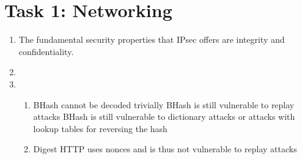 \section*{Task 1: Networking}
\begin{enumerate}
\item %
  The fundamental security properties that IPsec offers are integrity and confidentiality.

  \item \highergradesonly
  \item %
    \begin{enumerate}
    \item
      BHash cannot be decoded trivially
      BHash is still vulnerable to replay attacks
      BHash is still vulnerable to dictionary attacks or attacks with lookup tables for reversing the hash
    \item
      Digest HTTP uses nonces and is thus not vulnerable to replay attacks
    \end{enumerate}
\end{enumerate}
